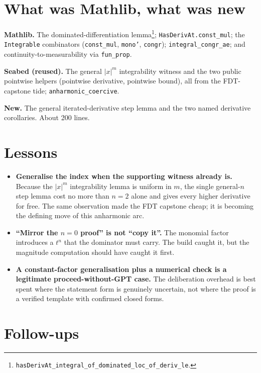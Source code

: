 \documentclass[11pt]{article}
\begin{document}
\section{What was Mathlib, what was new}

\textbf{Mathlib.} The dominated-differentiation
lemma\footnote{\texttt{hasDerivAt\_integral\_of\_dominated\_loc\_of\_deriv\_le}.};
\texttt{HasDerivAt.const\_mul}; the \texttt{Integrable} combinators
(\texttt{const\_mul}, \texttt{mono'}, \texttt{congr});
\texttt{integral\_congr\_ae}; and continuity-to-measurability via
\texttt{fun\_prop}.

\textbf{Seabed (reused).} The general $|x|^m$ integrability witness and the
two public pointwise helpers (pointwise derivative, pointwise bound), all
from the FDT-capstone tide; \texttt{anharmonic\_coercive}.

\textbf{New.} The general iterated-derivative step lemma and the two named
derivative corollaries. About 200 lines.

\section{Lessons}

\begin{itemize}[itemsep=3pt]
\item \textbf{Generalise the index when the supporting witness already is.}
  Because the $|x|^m$ integrability lemma is uniform in $m$, the single
  general-$n$ step lemma cost no more than $n=2$ alone and gives every
  higher derivative for free. The same observation made the FDT capstone
  cheap; it is becoming the defining move of this anharmonic arc.
\item \textbf{``Mirror the $n=0$ proof'' is not ``copy it''.} The monomial
  factor introduces a $t^n$ that the dominator must carry. The build caught
  it, but the magnitude computation should have caught it first.
\item \textbf{A constant-factor generalisation plus a numerical check is a
  legitimate proceed-without-GPT case.} The deliberation overhead is best
  spent where the statement form is genuinely uncertain, not where the proof
  is a verified template with confirmed closed forms.
\end{itemize}

\section{Follow-ups}
\end{document}
